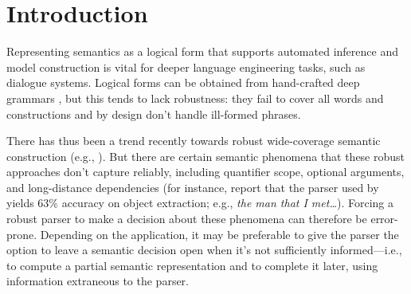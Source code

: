 \section{Introduction} \label{sec:intro}

Representing semantics as a logical form that supports automated
inference and model construction is vital for deeper language
engineering tasks, such as dialogue systems.  Logical forms
can be obtained from hand-crafted deep grammars
\cite{butt:etal:1999,copestake:flickinger:2000}, but this
tends to lack robustness: they fail to cover all
words and constructions and by design don't handle
ill-formed phrases. 

There has thus been a trend recently towards
robust wide-coverage semantic construction (e.g., 
\cite{bos:etal:2004,zettlemoyer:collins:2007}).     
% 
But there are certain semantic phenomena that these robust
approaches don't capture reliably, including quantifier scope,
optional arguments, and long-distance dependencies (for instance,
 report that the parser used by
 yields 63\% accuracy on object
extraction; e.g., {\em the man that I met\dots}).  Forcing a robust
parser to make a decision about these phenomena can therefore be
error-prone.  Depending on the application, it may be preferable to
give the parser the option to leave a semantic decision open when it's not
sufficiently informed---i.e., to compute a partial semantic
representation and to complete it later, using information
extraneous to the parser.

